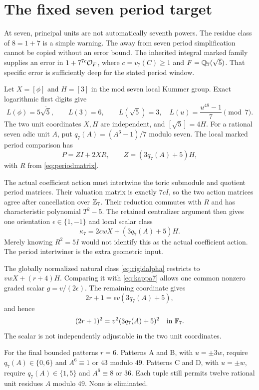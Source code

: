 \section{The fixed seven period target}\label{sec:fixedseven}
At seven, principal units are not automatically seventh powers. The residue class of $8=1+7$ is a simple warning. The away from seven period simplification cannot be copied without an error bound. The inherited integral marked family supplies an error in $1+7^{7c}\mathcal O_F$, where $c=v_7(C)\ge1$ and $F=\mathbb Q_7(\sqrt5)$. That specific error is sufficiently deep for the stated period window.

Let $X=[\phi]$ and $H=[3]$ in the mod seven local Kummer group. Exact logarithmic first digits give
\[
L(\phi)=5\overline{\sqrt5},\qquad L(3)=6,\qquad L(\sqrt5)=3,
\quad L(u)=\frac{u^{48}-1}{7}\pmod7.
\]
The two unit coordinates $X,H$ are independent, and $[\sqrt5]=4H$. For a rational seven adic unit $A$, put $q_7(A)=(A^6-1)/7$ modulo seven. The local marked period comparison has
\[
P=ZI+2XR,\qquad Z=(3q_7(A)+5)H,
\]
with $R$ from \eqref{eq:periodmatrix}.

The actual coefficient action must intertwine the toric submodule and quotient period matrices. Their valuation matrix is exactly $7cI$, so the two action matrices agree after cancellation over $\mathbb Z_7$. Their reduction commutes with $R$ and has characteristic polynomial $T^2-5$. The retained centralizer argument then gives one orientation $\epsilon\in\{1,-1\}$ and local scalar class
\begin{equation}\label{eq:kappa7}
\kappa_7=2\epsilon wX+(3q_7(A)+5)H.
\end{equation}
Merely knowing $R^2=5I$ would not identify this as the actual coefficient action. The period intertwiner is the extra geometric input.

The globally normalized natural class \eqref{eq:rigidalpha} restricts to $vwX+(r+4)H$. Comparing it with \eqref{eq:kappa7} allows one common nonzero graded scalar $g=v/(2\epsilon)$. The remaining coordinate gives
\[
2r+1=\epsilon v(3q_7(A)+5),
\]
and hence
\begin{equation}\label{eq:fermatquotient}
(2r+1)^2=v^2(3q_7(A)+5)^2\quad\text{in }\mathbb F_7.
\end{equation}
The scalar is not independently adjustable in the two unit coordinates.

For the final bounded patterns $r=6$. Patterns A and B, with $u=\pm3w$, require $q_7(A)\in\{0,6\}$ and $A^6\equiv1$ or $43$ modulo $49$. Patterns C and D, with $u=\pm w$, require $q_7(A)\in\{1,5\}$ and $A^6\equiv8$ or $36$. Each tuple still permits twelve rational unit residues $A$ modulo $49$. None is eliminated.

